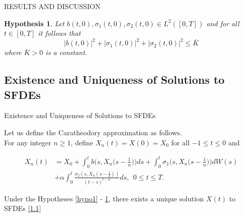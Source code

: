 \documentclass[unknownkeysallowed, compress]{beamer}
\newtheorem{hypothesis}[theorem]{\textbf{Hypothesis}}
\theoremstyle{plain}
\begin{document}
\begin{frame}[allowframebreaks]{RESULTS AND DISCUSSION}
\begin{hypothesis}\label{hypo2}
Let $b(t,0),\sigma_1(t,0), \sigma_2(t,0)\in L^2([0,T])$ and for all $t\in[0,T]$ it follows that
$$
|b(t,0)|^2+|\sigma_1(t,0)|^2+|\sigma_2(t,0)|^2\leq \bar{K}
$$
where $\bar{K}>0$ is a constant.
\end{hypothesis}
\end{frame}
\subsection{Existence and Uniqueness of Solutions to SFDEs}
\begin{frame}[allowframebreaks]{Existence and Uniqueness of Solutions to SFDEs}
\par Let us define the Carath$\acute{\mbox{e}}$odory approximation as follows.\\
For any integer $n\geq 1$, define $X_n(t) = X(0) = X_0$ for all $-1\leq t\leq 0$ and 

\begin{equation}\label{3.1}
\begin{split}
X_n(t) &= X_0+\int_0^t b\bigg(s,X_n\bigg(s-\frac{1}{n}\bigg)\bigg)ds+ \int_0^t\sigma_1\bigg(s,X_n\bigg(s-\frac{1}{n}\bigg)\bigg)dW(s)\\
&+\alpha\int_0^t\frac{\sigma_2(s,X_n(s-\frac{1}{2}))}{(t-s)^{l-\alpha}}ds,~~0\leq t\leq T.
\end{split}
\end{equation}
\begin{theorem}\label{3.1}
Under the  Hypotheses \ref{hypo1} - \ref{hypo2}, there exists a unique solution $X(t)$ to SFDEs \eqref{1.1}
\end{theorem}
\end{frame}
\end{document}
